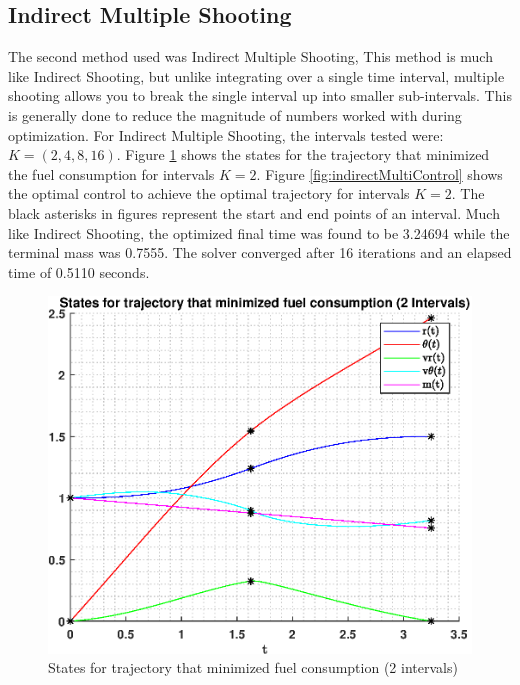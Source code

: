 \documentclass[]{article}
\begin{document}
\subsection{Indirect Multiple Shooting}
The second method used was Indirect Multiple Shooting, This method is much like Indirect Shooting, but unlike integrating over a single time interval, multiple shooting allows you to break the single interval up into smaller sub-intervals. This is generally done to reduce the magnitude of numbers worked with during optimization. For Indirect Multiple Shooting, the intervals tested were: \(K = (2, 4, 8, 16)\).
\vspace{2mm}\newline
Figure \ref{fig:indirectMultiStates} shows the states for the trajectory that minimized the fuel consumption for intervals \(K = 2\). Figure \ref{fig:indirectMultiControl} shows the optimal control to achieve the optimal trajectory for intervals \(K = 2\). The black asterisks in figures represent the start and end points of an interval. Much like Indirect Shooting, the optimized final time was found to be 3.24694 while the terminal mass was 0.7555. The solver converged after 16 iterations and an elapsed time of 0.5110 seconds.
\begin{figure}[hbt!]
	\centering
	\includegraphics[scale=0.75]{indirectMultiStates.eps}
	\caption{States for trajectory that minimized fuel consumption (2 intervals)}
	\label{fig:indirectMultiStates}
\end{figure}
\end{document}
